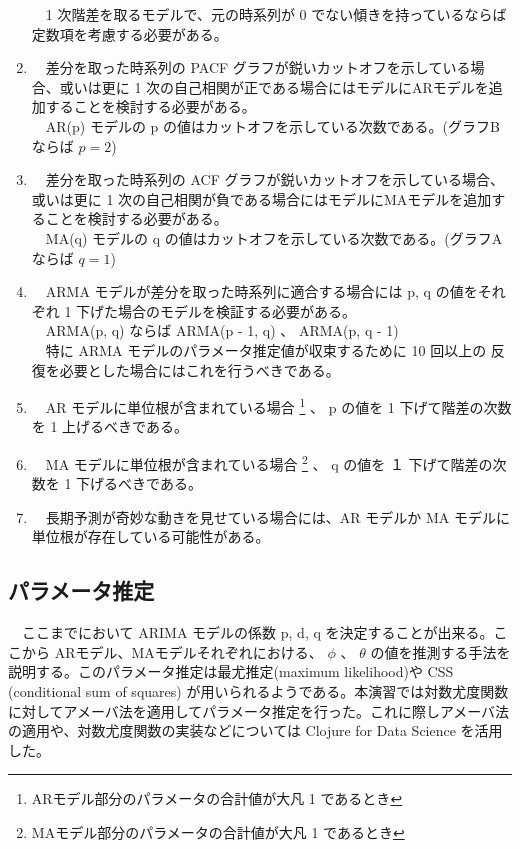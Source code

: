 \documentclass{scrartcl}
\begin{document}
\begin{enumerate}
　1 次階差を取るモデルで、元の時系列が 0 でない傾きを持っているならば 定数項を考慮する必要がある。\\
\item 　差分を取った時系列の PACF グラフが鋭いカットオフを示している場合、或いは更に 1 次の自己相関が正である場合にはモデルにARモデルを追加することを検討する必要がある。\\
　AR(p) モデルの p の値はカットオフを示している次数である。(グラフBならば \(p = 2\))\\
\item 　差分を取った時系列の ACF グラフが鋭いカットオフを示している場合、或いは更に 1 次の自己相関が負である場合にはモデルにMAモデルを追加することを検討する必要がある。\\
　MA(q) モデルの q の値はカットオフを示している次数である。(グラフAならば \(q=1\))\\
\item 　ARMA モデルが差分を取った時系列に適合する場合には p, q の値をそれぞれ 1 下げた場合のモデルを検証する必要がある。\\
　ARMA(p, q) ならば ARMA(p - 1, q) 、 ARMA(p, q - 1)\\
　特に ARMA モデルのパラメータ推定値が収束するために 10 回以上の 反復を必要とした場合にはこれを行うべきである。\\
\item 　AR モデルに単位根が含まれている場合 \footnote{ARモデル部分のパラメータの合計値が大凡 1 であるとき} 、 p の値を 1 下げて階差の次数を 1 上げるべきである。\\
\item 　MA モデルに単位根が含まれている場合 \footnote{MAモデル部分のパラメータの合計値が大凡 1 であるとき} 、 q の値を １ 下げて階差の次数を 1 下げるべきである。\\
\item 　長期予測が奇妙な動きを見せている場合には、AR モデルか MA モデルに単位根が存在している可能性がある。\\
\end{enumerate}

\subsection{パラメータ推定}
\label{sec:org25b7e6f}
　ここまでにおいて ARIMA モデルの係数 p, d, q を決定することが出来る。ここから ARモデル、MAモデルそれぞれにおける、 \(\phi\) 、 \(\theta\) の値を推測する手法を説明する。このパラメータ推定は最尤推定(maximum likelihood)や CSS (conditional sum of squares) が用いられるようである。本演習では対数尤度関数に対してアメーバ法を適用してパラメータ推定を行った。これに際しアメーバ法の適用や、対数尤度関数の実装などについては Clojure for Data Science \cite{data-science} を活用した。\\
\end{document}
